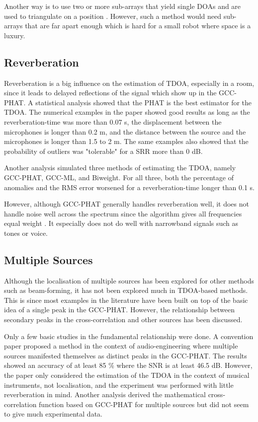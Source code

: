 \documentclass{report}
\begin{document}
Another way is to use two or more sub-arrays that yield single DOAs and are used to triangulate on a position \cite{rascon_localization_2017}. However, such a method would need sub-arrays that are far apart enough which is hard for a small robot where space is a luxury.


\subsection{Reverberation}

Reverberation is a big influence on the estimation of TDOA, especially in a room, since it leads to delayed reflections of the signal which show up in the GCC-PHAT. A statistical analysis \cite{gustafsson_source_2003} showed that the PHAT is the best estimator for the TDOA. The numerical examples in the paper showed good results as long as the reverberation-time was more than 0.07 \si{s}, the displacement between the microphones is longer than 0.2 \si{m}, and the distance between the source and the microphones is longer than 1.5 to 2 \si{m}. The same examples also showed that the probability of outliers was "tolerable" for a SRR more than 0 \si{dB}.

Another analysis \cite{brandstein_robust_1997} simulated three methods of estimating the TDOA, namely GCC-PHAT, GCC-ML, and Biweight. For all three, both the percentage of anomalies and the RMS error worsened for a reverberation-time longer than 0.1 \si{s}.

However, although GCC-PHAT generally handles reverberation well, it does not handle noise well across the spectrum since the algorithm gives all frequencies equal weight \cite{valin_robust_2003}. It especially does not do well with narrowband signals such as tones or voice.

\subsection{Multiple Sources}

Although the localisation of multiple sources has been explored for other methods such as beam-forming, it has not been explored much in TDOA-based methods. This is since most examples in the literature have been built on top of the basic idea of a single peak in the GCC-PHAT. However, the relationship between secondary peaks in the cross-correlation and other sources has been discussed.

Only a few basic studies in the fundamental relationship were done. A convention paper \cite{clifford_calculating_2010} proposed a method in the context of audio-engineering where multiple sources manifested themselves as distinct peaks in the GCC-PHAT. The results showed an accuracy of at least 85 \% where the SNR is at least 46.5 \si{dB}. However, the paper only considered the estimation of the TDOA in the context of musical instruments, not localisation, and the experiment was performed with little reverberation in mind. Another analysis \cite{kwon_analysis_2010} derived the mathematical cross-correlation function based on GCC-PHAT for multiple sources but did not seem to give much experimental data. 
\end{document}
